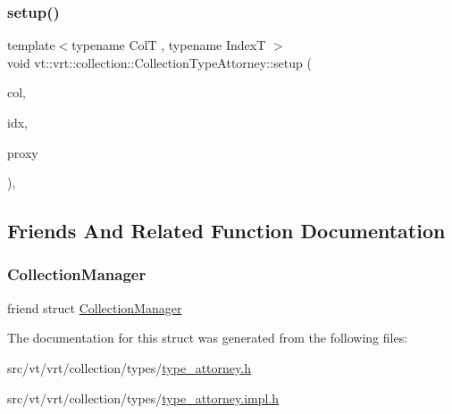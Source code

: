 \mbox{\label{structvt_1_1vrt_1_1collection_1_1_collection_type_attorney_aa6bf71b0055c677e8defea7fa71392b9}} 
\subsubsection{\texorpdfstring{setup()}{setup()}}
{\footnotesize\ttfamily template$<$typename ColT , typename IndexT $>$ \\
void vt\+::vrt\+::collection\+::\+Collection\+Type\+Attorney\+::setup (\begin{DoxyParamCaption}\item[{ColT const \&}]{col,  }\item[{IndexT const \&}]{idx,  }\item[{\hyperlink{namespacevt_a1b417dd5d684f045bb58a0ede70045ac}{Virtual\+Proxy\+Type} const \&}]{proxy }\end{DoxyParamCaption})\hspace{0.3cm}{\ttfamily [static]}, {\ttfamily [private]}}



\subsection{Friends And Related Function Documentation}
\mbox{\label{structvt_1_1vrt_1_1collection_1_1_collection_type_attorney_af9288b1963f434a90b307b5305a49510}} 
\subsubsection{\texorpdfstring{Collection\+Manager}{CollectionManager}}
{\footnotesize\ttfamily friend struct \hyperlink{structvt_1_1vrt_1_1collection_1_1_collection_manager}{Collection\+Manager}\hspace{0.3cm}{\ttfamily [friend]}}



The documentation for this struct was generated from the following files\+:\begin{DoxyCompactItemize}
\item 
src/vt/vrt/collection/types/\hyperlink{type__attorney_8h}{type\+\_\+attorney.\+h}\item 
src/vt/vrt/collection/types/\hyperlink{type__attorney_8impl_8h}{type\+\_\+attorney.\+impl.\+h}\end{DoxyCompactItemize}
